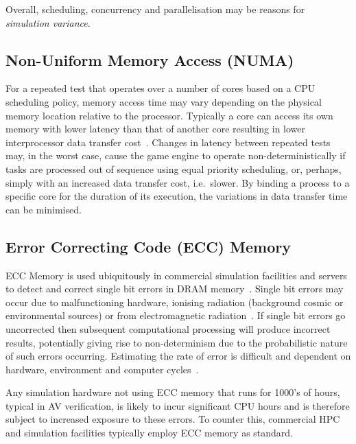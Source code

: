 Overall, scheduling, concurrency and parallelisation may be reasons for \textit{simulation variance}. 

\subsection{Non-Uniform Memory Access (NUMA)} \label{s:sources_numa}
For a repeated test that operates over a number of cores based on a CPU scheduling policy, memory access time may vary depending on the physical memory location relative to the processor. Typically a core can access its own memory with lower latency than that of another core resulting in lower interprocessor data transfer cost~\cite{nieplocha1996global}. 
%
Changes in latency between repeated tests may, in the worst case, cause the game engine to operate non-deterministically if tasks are processed out of sequence using equal priority scheduling, or, perhaps, simply with an increased data transfer cost, i.e.\ slower. 
%
By binding a process to a specific core for the duration of its execution, the variations in data transfer time can be minimised.


\subsection{Error Correcting Code (ECC) Memory}
ECC Memory is used ubiquitously in commercial simulation facilities and servers to detect and correct single bit errors in DRAM memory~\cite{Dell1997}. Single bit errors may occur due to malfunctioning hardware, ionising radiation (background cosmic or environmental sources) or from electromagnetic radiation~\cite{dodd2003basic}. If single bit errors go uncorrected then subsequent computational processing will produce incorrect results, potentially giving rise to non-determinism due to the probabilistic nature of such errors occurring. Estimating the rate of error is difficult and dependent on hardware, environment and computer cycles~\cite{mielke2008bit}.

Any simulation hardware not using ECC memory that runs for 1000's of hours, typical in AV verification, is likely to incur significant CPU hours and is therefore subject to increased exposure to these errors. To counter this, commercial HPC and simulation facilities typically employ ECC memory as standard.



